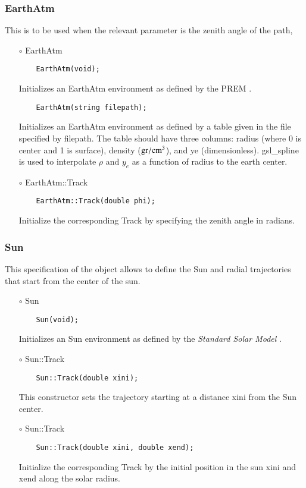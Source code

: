 \subsubsection{{EarthAtm}}
This is to be used when the relevant parameter is the zenith angle of
the path,
\begin{itemize}
\item[$\circ$] {\ttf EarthAtm}
  \begin{lstlisting}
    EarthAtm(void);
  \end{lstlisting}
  Initializes an {\ttf EarthAtm} environment as defined by the PREM \citep{dziewonski1981preliminary}.
  \begin{lstlisting}
    EarthAtm(string filepath);
  \end{lstlisting}
  Initializes an {\ttf EarthAtm} environment as defined by a table given in the file specified by {\ttf filepath}. The table should have three columns: radius (where 0 is center and 1 is surface), density (${\rm gr}/{\rm cm}^3$), and ye (dimensionless). {\ttfamily gsl\_spline} \citep{gough2009gnu} is used to interpolate $\rho$ and $y_e$ as a function of radius to the earth center.
  \item[$\circ$] {\ttf EarthAtm::Track}
  \begin{lstlisting}
    EarthAtm::Track(double phi);
  \end{lstlisting}
  Initialize the corresponding {\ttf Track} by specifying the zenith angle in radians.
\end{itemize}

\subsubsection{{Sun}}
This specification of the object allows to define the Sun and radial
trajectories that start from the center of the sun.
\begin{itemize}
\item[$\circ$] {\ttf Sun}
  \begin{lstlisting}
    Sun(void);
  \end{lstlisting}
  Initializes an {\ttf Sun} environment as defined by the {\it Standard Solar Model} \citep{bahcall2005new}.
  \item[$\circ$] {\ttf Sun::Track}
  \begin{lstlisting}
    Sun::Track(double xini);
  \end{lstlisting}
  This constructor sets the trajectory starting at a distance 
  {\ttf xini} from the Sun center.
  \item[$\circ$] {\ttf Sun::Track}
  \begin{lstlisting}
    Sun::Track(double xini, double xend);
  \end{lstlisting}
  Initialize the corresponding {\ttf Track} by the initial position in the sun {\ttf xini} and {\ttf xend} along the solar radius.
\end{itemize}